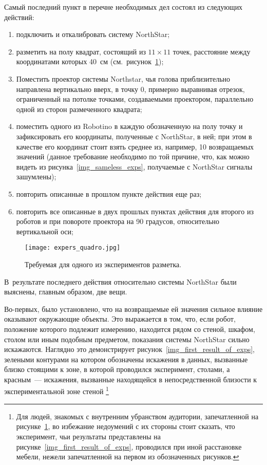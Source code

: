 Самый последний пункт в перечне необходимых дел состоял из следующих действий:
\begin{enumerate}
	\item подключить и откалибровать систему NorthStar;
	\item разметить на полу квадрат, состоящий из $11{\times}11$ точек, расстояние между координатами которых 40~см (см.~рисунок~\ref{img_expers_quadro});
	\item \label{item:alignment}Поместить проектор системы Northstar, чья голова приблизительно направлена вертикально вверх, в точку 0, примерно выравнивая отрезок, ограниченный на потолке точками, создаваемыми проектором, параллельно одной из сторон размеченного квадрата;
	\item поместить одного из Robotino в каждую обозначенную на полу точку и зафиксировать его координаты, полученные с NorthStar, в ней; при этом в качестве его координат стоит взять среднее из, например, 10 возвращаемых значений (данное требование необходимо по той причине, что, как можно видеть из рисунка~\ref{img_sameless_exps}, получаемые с NorthStar сигналы зашумлены);
	\item повторить описанные в прошлом пункте действия еще раз;
	\item повторить все описанные в двух прошлых пунктах действия для второго из роботов и при повороте проектора на 90 градусов, относительно вертикальной оси;
\end{enumerate}

\begin{figure}[h!]
	\centering
	\texttt{[image: expers\_quadro.jpg]}
	\caption{Требуемая для одного из экспериментов разметка.}
	\label{img_expers_quadro}
\end{figure}

В~результате последнего действия относительно системы NorthStar были выяснены, главным образом, две вещи.

Во-первых, было установлено, что на возвращаемые ей значения сильное влияние оказывают окружающие объекты.
Это выражается в том, что, если робот, положение которого подлежит измерению, находится рядом со стеной, шкафом, столом или иным подобным предметом, показания системы NorthStar сильно искажаются.
Наглядно это демонстрирует рисунок~\ref{img_first_result_of_exps}, зелеными контурами на котором обозначены искажения в данных, вызванные близко стоящими к зоне, в которой проводился эксперимент, столами, а красным~--- искажения, вызванные находящейся в непосредственной близости к экспериментальной зоне стеной%
\footnote{Для людей, знакомых с внутренним убранством аудитории, запечатленной на рисунке~\ref{img_expers_quadro}, во избежание недоумений с их стороны стоит сказать, что эксперимент, чьи результаты представлены на рисунке~\ref{img_first_result_of_exps}, проводился при иной расстановке мебели, нежели запечатленной на первом из обозначенных рисунков.}


